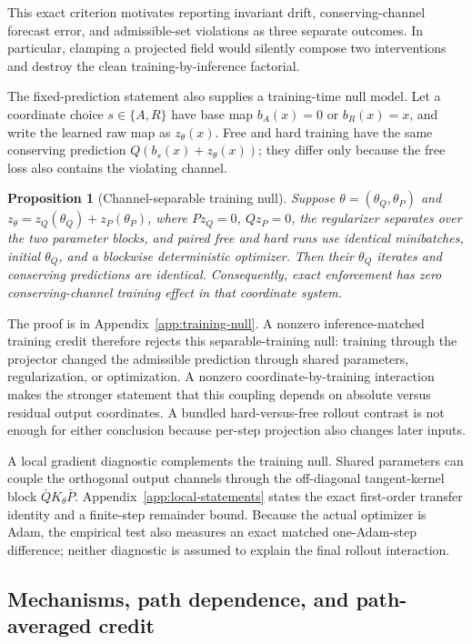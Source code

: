 \documentclass{article}
\newtheorem{proposition}{Proposition}
\begin{document}
This exact criterion motivates reporting invariant drift, conserving-channel forecast error, and
admissible-set violations as three separate outcomes. In particular, clamping a projected field
would silently compose two interventions and destroy the clean training-by-inference factorial.

The fixed-prediction statement also supplies a training-time null model. Let a coordinate choice
$s\in\{A,R\}$ have base map $b_A(x)=0$ or $b_R(x)=x$, and write the learned raw map as
$z_\theta(x)$. Free and hard training have the same conserving prediction
$Q(b_s(x)+z_\theta(x))$; they differ only because the free loss also contains the violating
channel.

\begin{proposition}[Channel-separable training null]
\label{prop:training-null}
Suppose $\theta=(\theta_Q,\theta_P)$ and
$z_\theta=z_Q(\theta_Q)+z_P(\theta_P)$, where $Pz_Q=0$, $Qz_P=0$, the regularizer separates over
the two parameter blocks, and paired free and hard runs use identical minibatches,
initial $\theta_Q$, and a blockwise deterministic optimizer. Then their $\theta_Q$ iterates and
conserving predictions are identical. Consequently, exact enforcement has zero
conserving-channel training effect in that coordinate system.
\end{proposition}

The proof is in Appendix~\ref{app:training-null}. A nonzero inference-matched training credit
therefore rejects this separable-training null: training through the projector changed the
admissible prediction through shared parameters, regularization, or optimization. A nonzero
coordinate-by-training interaction makes the stronger statement that this coupling depends on
absolute versus residual output coordinates. A bundled hard-versus-free rollout contrast is not
enough for either conclusion because per-step projection also changes later inputs.

A local gradient diagnostic complements the training null. Shared parameters can couple the
orthogonal output channels through the off-diagonal tangent-kernel block $\bar QK_\theta\bar P$.
Appendix~\ref{app:local-statements} states the exact first-order transfer identity and a
finite-step remainder bound. Because the actual optimizer is Adam, the empirical test also
measures an exact matched one-Adam-step difference; neither diagnostic is assumed to explain
the final rollout interaction.

\subsection{Mechanisms, path dependence, and path-averaged credit}
\end{document}
